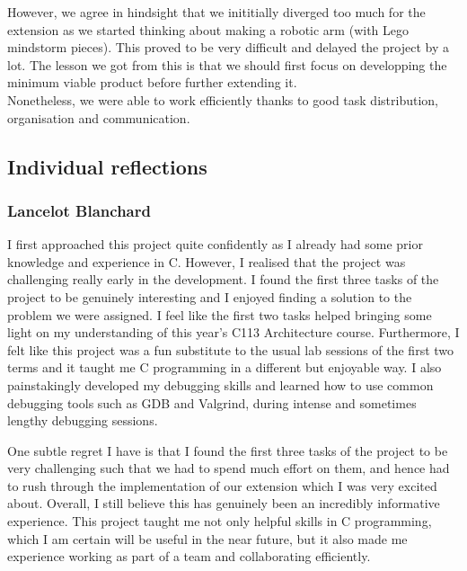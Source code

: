 \documentclass[11pt]{article}
\begin{document}
However, we agree in hindsight that we inititially diverged too much for the
extension as we started thinking about making a robotic arm (with Lego mindstorm
pieces). This proved to be very difficult and delayed the project by a lot. The
lesson we got from this is that we should first focus on developping the minimum
viable product before further extending it.\\

Nonetheless, we were able to work efficiently thanks to good task distribution,
organisation and communication.\\

\subsection{Individual reflections}
\subsubsection{Lancelot Blanchard}
I first approached this project quite confidently as I already had some prior knowledge 
and experience in C. However, I realised that the project was challenging really early in 
the development. I found the first three tasks of the project to be genuinely interesting 
and I enjoyed finding a solution to the problem we were assigned. I feel like the first two 
tasks helped bringing some light on my understanding of this year's C113 Architecture course. 
Furthermore, I felt like this project was a fun substitute to the usual lab sessions of the 
first two terms and it taught me C programming in a different but enjoyable way. I also 
painstakingly developed my debugging skills and learned how to use common debugging tools such 
as GDB and Valgrind, during intense and sometimes lengthy debugging sessions. 

One subtle regret I have is that I found the first three tasks of the project to be very 
challenging such that we had to spend much effort on them, and hence had to rush through the 
implementation of our extension which I was very excited about. Overall, I still believe this has 
genuinely been an incredibly informative experience. This project taught me not only helpful skills in 
C programming, which I am certain will be useful in the near future, but it also made me experience 
working as part of a team and collaborating efficiently.\\
\end{document}
